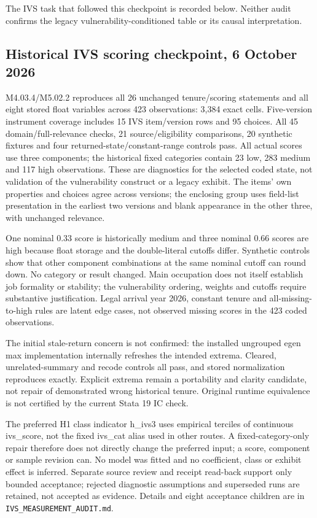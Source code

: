 \documentclass[11pt,a4paper]{article}
\begin{document}
The IVS task that followed this checkpoint is recorded below. Neither audit
confirms the legacy vulnerability-conditioned table or its causal interpretation.

\subsection{Historical IVS scoring checkpoint, 6 October 2026}
M4.03.4/M5.02.2 reproduces all 26 unchanged tenure/scoring statements and all
eight stored float variables across 423 observations: 3,384 exact cells.
Five-version instrument coverage includes 15 IVS item/version rows and 95
choices. All 45 domain/full-relevance checks, 21 source/eligibility comparisons,
20 synthetic fixtures and four returned-state/constant-range controls pass.
All actual scores use three components; the historical fixed categories contain
23 low, 283 medium and 117 high observations. These are diagnostics for the
selected coded state, not validation of the vulnerability construct or a
legacy exhibit. The items' own properties and choices agree across versions;
the enclosing group uses field-list presentation in the earliest two versions
and blank appearance in the other three, with unchanged relevance.

One nominal 0.33 score is historically medium and three nominal 0.66 scores
are high because float storage and the double-literal cutoffs differ. Synthetic
controls show that other component combinations at the same nominal cutoff
can round down. No category or result changed. Main occupation does not itself
establish job formality or stability; the vulnerability ordering, weights and
cutoffs require substantive justification. Legal arrival year 2026, constant
tenure and all-missing-to-high rules are latent edge cases, not observed missing
scores in the 423 coded observations.

The initial stale-return concern is not confirmed: the installed ungrouped
egen max implementation internally refreshes the intended extrema. Cleared,
unrelated-summary and recode controls all pass, and stored normalization
reproduces exactly. Explicit extrema remain a portability and clarity candidate,
not repair of demonstrated wrong historical tenure. Original runtime equivalence
is not certified by the current Stata 19 IC check.

The preferred H1 class indicator h\_ivs3 uses empirical terciles of continuous
ivs\_score, not the fixed ivs\_cat alias used in other routes. A fixed-category-only
repair therefore does not directly change the preferred input; a score,
component or sample revision can. No model was fitted and no coefficient,
class or exhibit effect is inferred. Separate source review and receipt
read-back support only bounded acceptance; rejected diagnostic assumptions
and superseded runs are retained, not accepted as evidence. Details and eight
acceptance children are in \texttt{IVS\_MEASUREMENT\_AUDIT.md}.
\end{document}
